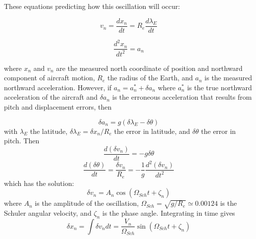 \documentclass[12pt,twoside,english]{article}\usepackage[]{graphicx}\usepackage[]{color}
\let\OrgIndex\index
\renewcommand*{\index}[1]{\OrgIndex{#1}}
\begin{document}
These equations predicting how this oscillation will occur: 

\begin{equation}
v_{n}=\frac{dx_{n}}{dt}=R_{e}\frac{d\lambda_E}{dt}\label{eq:vn} 
\end{equation}


\begin{equation}
\frac{d^{2}x_{n}}{dt^{2}}=a_{n}\label{eq:an}
\end{equation}


where $x_{n}$ and $v_n$ are the measured north coordinate of position and
northward component of aircraft motion, $R_e$ the radius of the Earth, and $a_{n}$ is the measured northward acceleration. However, if $a_{n}=a_{n}^{*}+\delta a_{n}$ where $a_{n}^{*}$ is the true northward acceleration of the aircraft and $\delta a_{n}$ is the erroneous acceleration that results from pitch and displacement errors, then 

\begin{equation}
\delta a_{n}=g(\delta\lambda_E-\delta\theta)\label{eq:delta-an} 
\end{equation}
with $\lambda_E$ the latitude, $\delta\lambda_E=\delta x_{n}/R_{e}$ the error in latitude, and $\delta\theta$ the error in pitch. Then\\ 
\begin{equation}
\frac{d(\delta v_{n})}{dt}=-g\delta\theta\label{eq:delta-vn-dot}
\end{equation}
\begin{equation}
\frac{d(\delta\theta)}{dt}=\frac{\delta v_{n}}{R_{e}}=-\frac{1}{g}\frac{d^{2}(\delta v_{n})}{dt^{2}}\label{eq:delta-theta-dot}
\end{equation}
which has the solution:\\ 
\begin{equation}
\delta v_{n}=A_{n}\cos(\Omega_{Sch}t+\zeta_{n})\label{eq:delta-vn-solution} 
\end{equation}
where $A_{n}$ 
is the amplitude of the oscillation, $\Omega_{Sch}=\sqrt{g/R_{e}}\simeq0.00124$
is the Schuler angular
velocity, and $\zeta_n$ is the phase angle. Integrating in time gives\\ 
\begin{equation}
\delta x_{n}=\int\delta v_{n}dt=\frac{V_{n}}{\Omega_{Sch}}\sin(\Omega_{Sch}t+\zeta_{n})\label{eq:delta-xn-solution} 
\end{equation}
\end{document}
